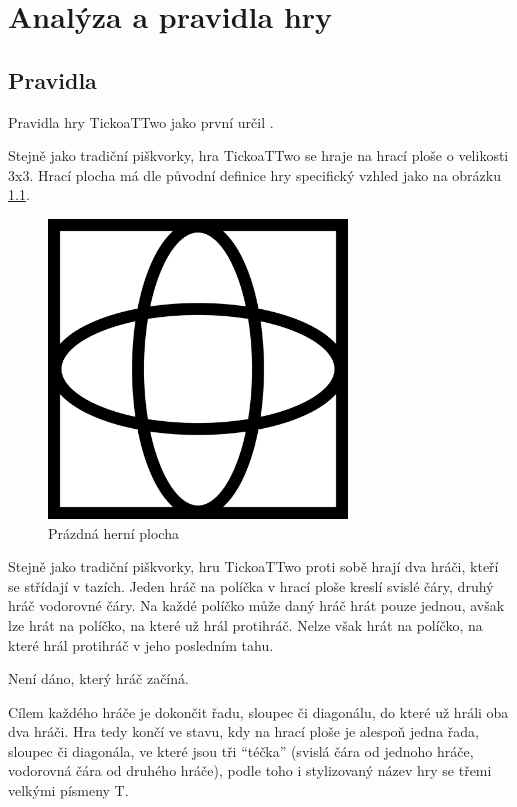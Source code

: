 \chapter{Analýza a pravidla hry}

\section{Pravidla}
Pravidla hry TickoaTTwo jako první určil \textcite{jenkins22}.

Stejně jako tradiční piškvorky, hra TickoaTTwo se hraje na hrací ploše o
velikosti 3x3. Hrací plocha má dle původní definice hry specifický vzhled jako
na obrázku \ref{fig:empty-board}.

\begin{figure}[h]
    \centering
    \includegraphics[width=300px]{img/empty-board.png}
    \caption{Prázdná herní plocha}
    \label{fig:empty-board}
\end{figure}

Stejně jako tradiční piškvorky, hru TickoaTTwo proti sobě hrají dva hráči,
kteří se střídají v tazích. Jeden hráč na políčka v hrací ploše kreslí svislé
čáry, druhý hráč vodorovné čáry. Na každé políčko může daný hráč hrát pouze
jednou, avšak lze hrát na políčko, na které už hrál protihráč. Nelze však hrát
na políčko, na které hrál protihráč v jeho posledním tahu.

Není dáno, který hráč začíná.

Cílem každého hráče je dokončit řadu, sloupec či diagonálu, do které už hráli
oba dva hráči. Hra tedy končí ve stavu, kdy na hrací ploše je alespoň jedna
řada, sloupec či diagonála, ve které jsou tři \enquote{téčka} (svislá čára od
jednoho hráče, vodorovná čára od druhého hráče), podle toho i stylizovaný název
hry se třemi velkými písmeny T.


